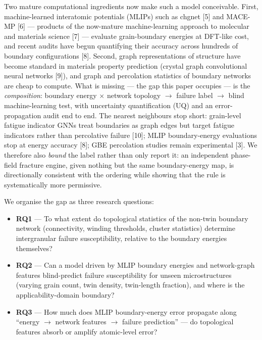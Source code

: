 \documentclass[11pt]{article}
\begin{document}
Two mature computational ingredients now make such a model conceivable. First, machine-learned interatomic potentials (MLIPs) such as chgnet [5] and MACE-MP [6] --- products of the now-mature machine-learning approach to molecular and materials science [7] --- evaluate grain-boundary energies at DFT-like cost, and recent audits have begun quantifying their accuracy across hundreds of boundary configurations [8]. Second, graph representations of structure have become standard in materials property prediction (crystal graph convolutional neural networks [9]), and graph and percolation statistics of boundary networks are cheap to compute. What is missing --- the gap this paper occupies --- is the \textit{composition}: boundary energy $\times$ network topology $\rightarrow$ failure label $\rightarrow$ blind machine-learning test, with uncertainty quantification (UQ) and an error-propagation audit end to end. The nearest neighbours stop short: grain-level fatigue indicator GNNs treat boundaries as graph edges but target fatigue indicators rather than percolative failure [10]; MLIP boundary-energy evaluations stop at energy accuracy [8]; GBE percolation studies remain experimental [3]. We therefore also \textit{bound} the label rather than only report it: an independent phase-field fracture engine, given nothing but the same boundary-energy map, is directionally consistent with the ordering while showing that the rule is systematically more permissive.

We organise the gap as three research questions:

\begin{itemize}
\item \textbf{RQ1} --- To what extent do topological statistics of the non-twin boundary network (connectivity, winding thresholds, cluster statistics) determine intergranular failure susceptibility, relative to the boundary energies themselves?
\item \textbf{RQ2} --- Can a model driven by MLIP boundary energies and network-graph features blind-predict failure susceptibility for unseen microstructures (varying grain count, twin density, twin-length fraction), and where is the applicability-domain boundary?
\item \textbf{RQ3} --- How much does MLIP boundary-energy error propagate along ``energy $\rightarrow$ network features $\rightarrow$ failure prediction'' --- do topological features absorb or amplify atomic-level error?
\end{itemize}
\end{document}
